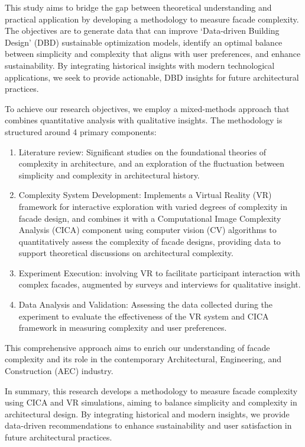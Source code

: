 This study aims to bridge the gap between theoretical understanding and practical application by developing a methodology to measure facade complexity.
The objectives are to generate data that can improve `Data-driven Building Design' (DBD) sustainable optimization models, identify an optimal balance between simplicity and complexity that aligns with user preferences, and enhance sustainability.
By integrating historical insights with modern technological applications, we seek to provide actionable, DBD insights for future architectural practices.

To achieve our research objectives, we employ a mixed-methods approach that combines quantitative analysis with qualitative insights.
The methodology is structured around 4 primary components:

\begin{enumerate}
    \item Literature review: Significant studies on the foundational theories of complexity in architecture, and an exploration of the fluctuation between simplicity and complexity in architectural history.
    \item Complexity System Development: Implements a Virtual Reality (VR) framework for interactive exploration with varied degrees of complexity in facade design, and combines it with a Computational Image Complexity Analysis (CICA) component using computer vision (CV) algorithms to quantitatively assess the complexity of facade designs, providing data to support theoretical discussions on architectural complexity.
    \item Experiment Execution: involving VR to facilitate participant interaction with complex facades, augmented by surveys and interviews for qualitative insight.
    \item Data Analysis and Validation: Assessing the data collected during the experiment to evaluate the effectiveness of the VR system and CICA framework in measuring complexity and user preferences.
\end{enumerate}

This comprehensive approach aims to enrich our understanding of facade complexity and its role in the contemporary Architectural, Engineering, and Construction (AEC) industry.

In summary, this research develops a methodology to measure facade complexity using CICA and VR simulations, aiming to balance simplicity and complexity in architectural design.
 By integrating historical and modern insights, we provide data-driven recommendations to enhance sustainability and user satisfaction in future architectural practices.





%
